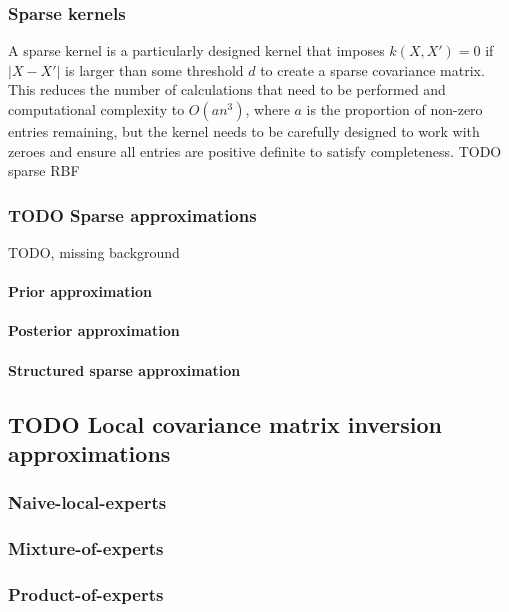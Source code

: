 \subsubsection{Sparse kernels}
A sparse kernel is a particularly designed kernel that imposes $k(X,X') = 0$ if $|X - X'|$ is larger than some threshold $d$ to create a sparse covariance matrix. This reduces the number of calculations that need to be performed and computational complexity to $O(an^3)$, where $a$ is the proportion of non-zero entries remaining, but the kernel needs to be carefully designed to work with zeroes and ensure all entries are positive definite to satisfy completeness. TODO sparse RBF


\subsubsection{TODO Sparse approximations}
TODO, missing background

\paragraph{Prior approximation}
\paragraph{Posterior approximation}
\paragraph{Structured sparse approximation}


\subsection{TODO Local covariance matrix inversion approximations \cite{big-data}}

\subsubsection{Naive-local-experts}

\subsubsection{Mixture-of-experts}

\subsubsection{Product-of-experts}


